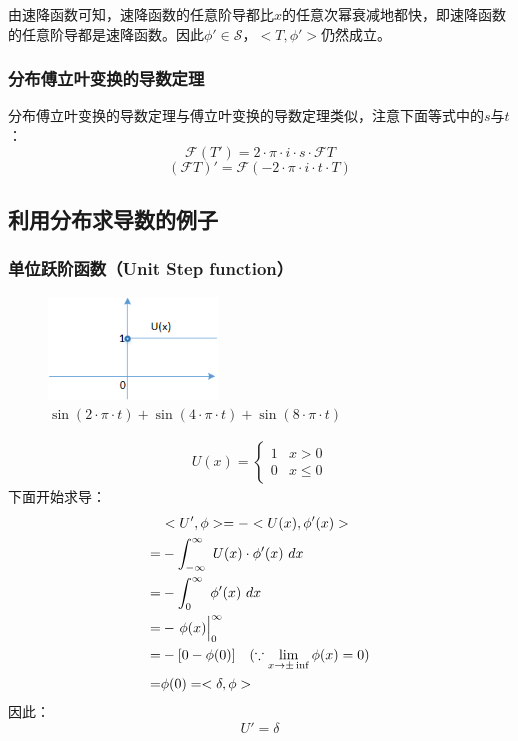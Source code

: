 由速降函数可知，速降函数的任意阶导都比$x$的任意次幂衰减地都快，即速降函数的任意阶导都是速降函数。因此$\phi'\in \mathcal  {S}$，$<T,\phi'>$仍然成立。
\subsubsection{分布傅立叶变换的导数定理}
分布傅立叶变换的导数定理与傅立叶变换的导数定理类似，注意下面等式中的$s$与$t$：
\begin{equation}
	\mathcal{F}(T')=2\cdot\pi\cdot i\cdot s\cdot \mathcal{F}T
\end{equation}
\begin{equation}
	(\mathcal{F}T)'=\mathcal{F}(-2\cdot\pi\cdot i\cdot t\cdot T)
\end{equation}

\subsection{利用分布求导数的例子}
\subsubsection {单位跃阶函数（Unit Step function）}
\begin{figure}[H]
	\centering
	\includegraphics[width=0.4\textwidth]{assets/U_function.png}
	\caption{$\sin(2\cdot\pi\cdot t)+\sin(4\cdot\pi\cdot t)+\sin(8\cdot\pi\cdot t)$}
\end{figure}
\begin{align*}
	U(x)=
	\begin{cases}
		1 & x>0    \\
		0 & x\leq0
	\end{cases}
\end{align*}
下面开始求导：
\begin{align*}
	  & <U',\phi>=-<U(x),\phi'(x)>                                                  \\
	= & -\int_{-\infty}^{\infty}\ U(x)\cdot \phi'(x)\ dx                            \\
	= & -\int_{0}^{\infty}\ \phi'(x)\ dx                                            \\
	= & -\rsx{\phi(x)}_0^\infty                                                     \\
	= & -[0-\phi(0)]   \quad  (\because \lim\limits_{x\rightarrow\pm\inf}\phi(x)=0) \\
	= & \phi(0) = <\delta,\phi>
\end{align*}
因此：
\begin{equation}
	U'=\delta
\end{equation}


